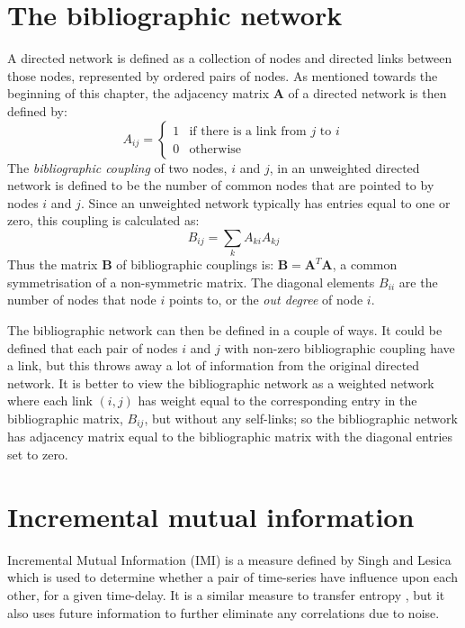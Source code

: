 \section{The bibliographic network}
A directed network is defined as a collection of nodes and directed links between those nodes, represented by ordered pairs of nodes.  As mentioned towards the beginning of this chapter, the adjacency matrix $\mathbf{A}$ of a directed network is then defined by:
\begin{equation}
A_{ij} = \left\{ \begin{array}{ll} 1 & \text{if there is a link from $j$ to $i$} \\ 0 & \text{otherwise} \end{array}\right.
\end{equation}
The \emph{bibliographic coupling} of two nodes, $i$ and $j$, in an unweighted directed network is defined to be the number of common nodes that are pointed to by nodes $i$ and $j$.  Since an unweighted network typically has entries equal to one or zero, this coupling is calculated as:
\begin{equation}
B_{ij} = \sum_k A_{ki} A_{kj}
\end{equation}
Thus the matrix $\mathbf{B}$ of bibliographic couplings is: $\mathbf{B} = \mathbf{A}^T\mathbf{A}$, a common symmetrisation of a non-symmetric matrix.  The diagonal elements $B_{ii}$ are the number of nodes that node $i$ points to, or the \emph{out degree} of node $i$.

The bibliographic network can then be defined in a couple of ways.  It could be defined that each pair of nodes $i$ and $j$ with non-zero bibliographic coupling have a link, but this throws away a lot of information from the original directed network.  It is better to view the bibliographic network as a weighted network where each link $(i,j)$ has weight equal to the corresponding entry in the bibliographic matrix, $B_{ij}$, but without any self-links; so the bibliographic network has adjacency matrix equal to the bibliographic matrix with the diagonal entries set to zero.

\section{Incremental mutual information}
Incremental Mutual Information (IMI) is a measure defined by Singh and Lesica \citep{SinghLesica2010a} which is used to determine whether a pair of time-series have influence upon each other, for a given time-delay.  It is a similar measure to transfer entropy \citep{Schreiber2000a}, but it also uses future information to further eliminate any correlations due to noise.

